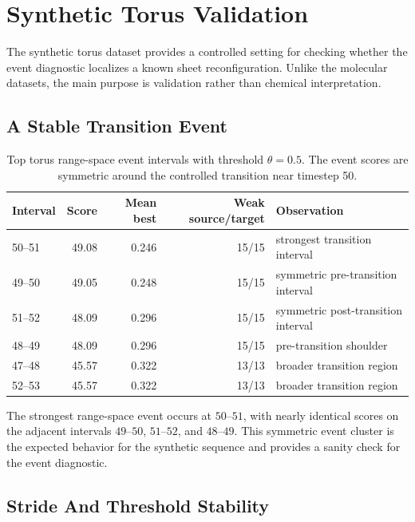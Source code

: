 \section{Synthetic Torus Validation}
\label{sec:results-torus}

The synthetic torus dataset provides a controlled setting for checking whether
the event diagnostic localizes a known sheet reconfiguration. Unlike the
molecular datasets, the main purpose is validation rather than chemical
interpretation.

\subsection{A Stable Transition Event}

\begin{table}[t]
  \centering
  \caption{Top torus range-space event intervals with threshold \(\theta=0.5\).
  The event scores are symmetric around the controlled transition near
  timestep 50.}
  \label{tab:torus-events}
  \begin{tabular}{lrrrl}
    \toprule
    Interval & Score & Mean best & Weak source/target & Observation \\
    \midrule
    50--51 & 49.08 & 0.246 & 15/15 & strongest transition interval \\
    49--50 & 49.05 & 0.248 & 15/15 & symmetric pre-transition interval \\
    51--52 & 48.09 & 0.296 & 15/15 & symmetric post-transition interval \\
    48--49 & 48.09 & 0.296 & 15/15 & pre-transition shoulder \\
    47--48 & 45.57 & 0.322 & 13/13 & broader transition region \\
    52--53 & 45.57 & 0.322 & 13/13 & broader transition region \\
    \bottomrule
  \end{tabular}
\end{table}

The strongest range-space event occurs at \(50\)--\(51\), with nearly identical
scores on the adjacent intervals \(49\)--\(50\), \(51\)--\(52\), and
\(48\)--\(49\). This symmetric event cluster is the expected behavior for the
synthetic sequence and provides a sanity check for the event diagnostic.

\subsection{Stride And Threshold Stability}

